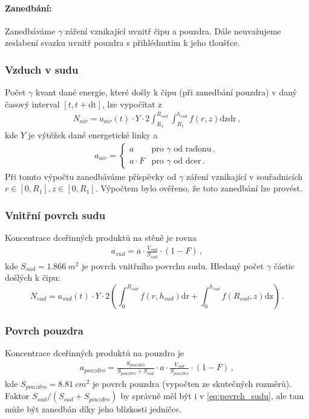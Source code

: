 \documentclass[11pt,a4paper]{article}
\begin{document}
\paragraph{Zanedbání:} Zanedbáváme $\gamma$ záření vznikající uvnitř čipu a pouzdra. Dále neuvažujeme zeslabení svazku uvnitř pouzdra s přihlédnutím k jeho tloušťce.
\subsubsection{Vzduch v sudu}
Počet $\gamma$ kvant dané energie, které došly k čipu (při zanedbání pouzdra) v daný časový interval $[t,t+\mathrm{dt}]$, lze vypočítat z
\begin{align}
	N_{air}=a_{air}(t)\cdot Y\cdot 2\int_{R_1}^{R_{sud}}\int_{R_1}^{h_{sud}}f(r,z)\mathrm{dz}\mathrm{dr}\,,
\end{align}
kde $Y$ je výtěžek dané energetické linky a
\begin{align}
a_{air}=\begin{cases}
a & \text{pro $\gamma$ od radonu}\,,\\
a\cdot F & \text{pro $\gamma$ od dcer}\,.
\end{cases}
\end{align}
Při tomto výpočtu zanedbáváme příspěvky od $\gamma$ záření vznikající v souřadnicích $r\in[0,R_1], z\in[0,R_1]$. Výpočtem bylo ověřeno, že toto zanedbání lze provést.
\subsubsection{Vnitřní povrch sudu}
Koncentrace dceřinných produktů na stěně je rovna
\begin{align}
a_{sud}=a\cdot \frac{V_{sud}}{S_{sud}}\cdot (1-F)\,,\label{eq:povrch_sudu}
\end{align}
kde $S_{sud}=\SI{1,866}{m^2}$ je povrch vnitřního povrchu sudu. Hledaný počet $\gamma$ částic došlých k čipu:
\begin{equation}
N_{sud}=a_{sud}(t) \cdot Y\cdot 2\left(\int_{0}^{R_{sud}}f(r,h_{sud})\mathrm{dr}+\int_{0}^{h_{sud}}f(R_{sud},z)\mathrm{dz}\right)\,.
\end{equation}
\subsubsection{Povrch pouzdra}
Koncentrace dceřinných produktů na pouzdro je
\begin{align}
a_{pouzdro}=\frac{S_{pouzdro}}{S_{pouzdro}+S_{sud}}\cdot a\cdot \frac{V_{sud}}{S_{pouzdro}}\cdot (1-F)\,,
\end{align}
kde $S_{pouzdro}=\SI{8,81}{cm^2}$ je povrch pouzdra (vypočten ze skutečných rozměrů). Faktor $S_{sud}/(S_{sud}+S_{pouzdro})$ by správně měl být i v \eqref{eq:povrch_sudu}, ale tam může být zanedbán díky jeho blízkosti jedničce.
\end{document}

